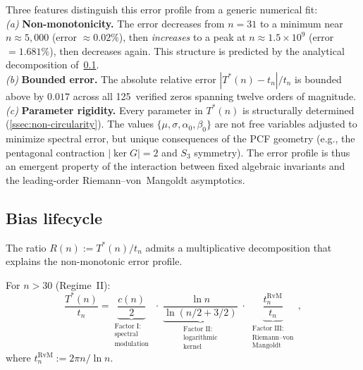 Three features distinguish this error profile from a generic numerical fit:
\\
\emph{(a)} \textbf{Non-monotonicity.}  The error decreases from $n=31$ to a minimum near $n \approx 5{,}000$ (error $\approx 0.02\%$), then \emph{increases} to a peak at $n \approx 1.5 \times 10^9$ (error $= 1.681\%$), then decreases again.  This structure is predicted by the analytical decomposition of~\cref{ssec:bias}.
\\
\emph{(b)} \textbf{Bounded error.}  The absolute relative error $|T^*(n) - t_n|/t_n$ is bounded above by $0.017$ across all 125~verified zeros spanning twelve orders of magnitude.
\\
\emph{(c)} \textbf{Parameter rigidity.}  Every parameter in $T^*(n)$ is structurally determined (\cref{ssec:non-circularity}). The values $\{\mu, \sigma, \alpha_0, \beta_0\}$ are not free variables adjusted to minimize spectral error, but unique consequences of the PCF geometry (e.g., the pentagonal contraction $|\ker G|=2$ and $S_3$ symmetry). The error profile is thus an emergent property of the interaction between fixed algebraic invariants and the leading-order Riemann--von~Mangoldt asymptotics.




\subsection{Bias lifecycle}\label{ssec:bias}

The ratio $R(n) := T^*(n)/t_n$ admits a multiplicative decomposition
that explains the non-monotonic error profile.
\begin{Theorem}\label{thm:bias-decomposition}
For $n > 30$ (Regime~II):
\begin{equation}\label{eq:bias-decomp}
  \frac{T^*(n)}{t_n}
  = \underbrace{\frac{c(n)}{2}}_{\substack{\text{Factor~I:}\\\text{spectral}\\\text{modulation}}}
  \;\cdot\;
  \underbrace{\frac{\ln n}{\ln(n/2 + 3/2)}}_{\substack{\text{Factor~II:}\\\text{logarithmic}\\\text{kernel}}}
  \;\cdot\;
  \underbrace{\frac{t_n^{\mathrm{RvM}}}{t_n}}_{\substack{\text{Factor~III:}\\\text{Riemann--von}\\\text{Mangoldt}}}
  \,,
\end{equation}
where $t_n^{\mathrm{RvM}} := 2\pi n/\ln n$.
\end{Theorem}


